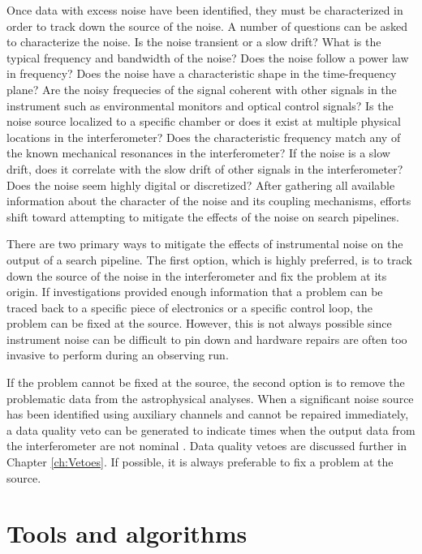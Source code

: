 Once data with excess noise have been identified, they must be characterized 
in order to track down the source of the noise. A number of questions can 
be asked to characterize the noise. Is the noise transient or a slow 
drift? What is the typical frequency and bandwidth of the noise? Does the 
noise follow a power law in frequency? Does the 
noise have a characteristic shape in the time-frequency plane? Are the 
noisy frequecies of the signal coherent with other signals in the instrument 
such as environmental monitors and optical control signals? 
Is the noise source localized to a specific chamber or does it exist at 
multiple physical locations in the interferometer? Does the characteristic 
frequency match any of the known mechanical resonances in the interferometer? 
If the noise is a slow drift, does it correlate with the slow drift of 
other signals in the interferometer? Does the noise seem highly digital 
or discretized? After gathering all available information about the 
character of the noise and its coupling mechanisms, efforts shift 
toward attempting to mitigate the effects of the noise on search 
pipelines. 

There are two primary ways to mitigate the effects of instrumental noise on 
the output of a search pipeline. The first option, which is highly preferred, 
is to track down the source of the noise in the interferometer and fix the 
problem at its origin. If investigations provided enough information that 
a problem can be traced back to a specific piece of electronics or a 
specific control loop, the problem can be fixed at the source. However, 
this is not always possible since instrument noise can be difficult to 
pin down and hardware repairs are often too invasive to perform during 
an observing run.

If the problem cannot be fixed at the source, the second option is to 
remove the problematic data from the astrophysical analyses. 
When a significant noise source has
been identified using auxiliary channels and cannot be repaired immediately, 
a data quality veto can be generated
to indicate times when the output data from the interferometer are not nominal
\cite{Nuttall:2015dqa,S6DetChar,GW150914-DETCHAR,Amaldi}.
Data quality vetoes are discussed further in Chapter \ref{ch:Vetoes}.  
If possible, it is always preferable to fix a problem at the source. 

\section{Tools and algorithms}\label{sec:tools}

